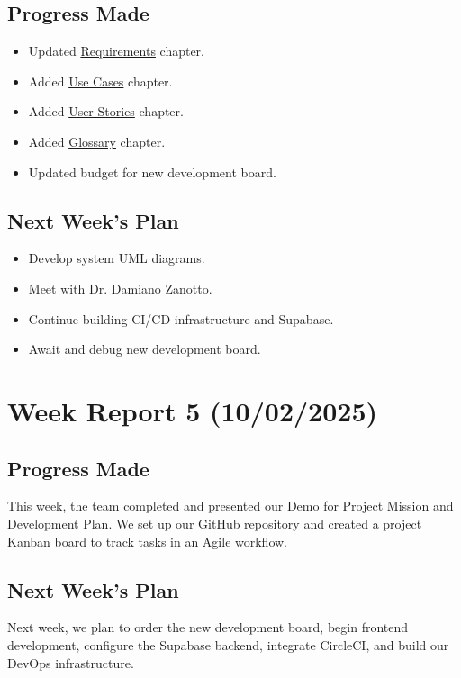 \subsection{Progress Made}
\begin{itemize}
    \item Updated \hyperref[Chapter::Requirements]{Requirements} chapter.
    \item Added \hyperref[Chapter::UseCases]{Use Cases} chapter.
    \item Added \hyperref[Chapter::UserStories]{User Stories} chapter.
    \item Added \hyperref[Chapter::Glossary]{Glossary} chapter.
    \item Updated budget for new development board.
\end{itemize}

\subsection{Next Week's Plan}
\begin{itemize}
    \item Develop system UML diagrams.
    \item Meet with Dr. Damiano Zanotto.
    \item Continue building CI/CD infrastructure and Supabase.
    \item Await and debug new development board.
\end{itemize}


\section{Week Report 5 (10/02/2025)}
\label{sec:report5}

\subsection{Progress Made}
This week, the team completed and presented our Demo for Project Mission and Development Plan. We set up our GitHub repository and created a project Kanban board to track tasks in an Agile workflow.

\subsection{Next Week's Plan}
Next week, we plan to order the new development board, begin frontend development, configure the Supabase backend, integrate CircleCI, and build our DevOps infrastructure.


